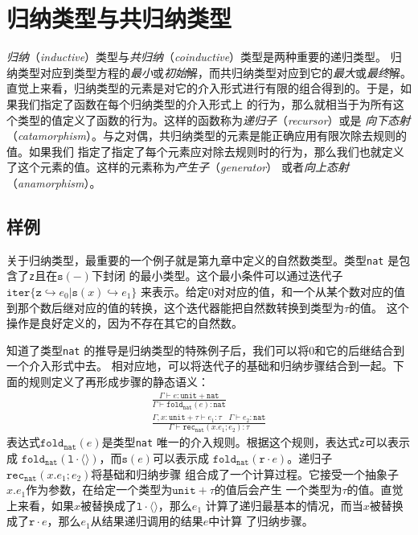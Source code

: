 \chapter{归纳类型与共归纳类型}

\textit{归纳}（\textit{inductive}）类型与\textit{共归纳}（\textit{coinductive}）类型是两种重要的递归类型。
归纳类型对应到类型方程的\textit{最小}或\textit{初始}解，而共归纳类型对应到它的\textit{最大}或\textit{最终}解。
直觉上来看，归纳类型的元素是对它的介入形式进行有限的组合得到的。于是，如果我们指定了函数在每个归纳类型的介入形式上
的行为，那么就相当于为所有这个类型的值定义了函数的行为。这样的函数称为\textit{递归子}（\textit{recursor}）或是
\textit{向下态射}（\textit{catamorphism}）。与之对偶，共归纳类型的元素是能正确应用有限次除去规则的值。如果我们
指定了指定了每个元素应对除去规则时的行为，那么我们也就定义了这个元素的值。这样的元素称为\textit{产生子}（\textit{generator}）
或者\textit{向上态射}（\textit{anamorphism}）。

\section{样例}\label{section-15.1}

关于归纳类型，最重要的一个例子就是第九章中定义的自然数类型。类型\texttt{nat} 是包含了\texttt{z}且在$\texttt{s}(-)$下封闭
的最小类型。这个最小条件可以通过迭代子$\texttt{iter} \{\texttt{z}\hookrightarrow e_0|\texttt{s}(x)\hookrightarrow e_1\}$
来表示。给定0对对应的值，和一个从某个数对应的值到那个数后继对应的值的转换，这个迭代器能把自然数转换到类型为$\tau$的值。
这个操作是良好定义的，因为不存在其它的自然数。

知道了类型\texttt{nat} 的推导是归纳类型的特殊例子后，我们可以将0和它的后继结合到一个介入形式中去。
相对应地，可以将迭代子的基础和归纳步骤结合到一起。下面的规则定义了再形成步骤的静态语义：
\begin{subequations}
	\begin{gather}
	\frac{\Gamma\vdash e:\texttt{unit} +\texttt{nat}}{\Gamma\vdash\texttt{fold}_\texttt{nat}(e):\texttt{nat}} \\
	\frac{\Gamma,x:\texttt{unit} + \tau\vdash e_1:\tau\ \ \ \ \Gamma\vdash e_2:\texttt{nat}}{\Gamma\vdash\texttt{rec}_\texttt{nat}(x.e_1;e_2):\tau}
	\end{gather}
\end{subequations}
表达式$\texttt{fold}_\texttt{nat}(e)$是类型\texttt{nat} 唯一的介入规则。根据这个规则，表达式\texttt{z}可以表示成
$\texttt{fold}_\texttt{nat}(\texttt{l}\cdot\langle\rangle)$，而$\texttt{s}(e)$可以表示成
$\texttt{fold}_\texttt{nat}(\texttt{r}\cdot e)$。递归子$\texttt{rec}_\texttt{nat}(x.e_1;e_2)$将基础和归纳步骤
组合成了一个计算过程。它接受一个抽象子$x.e_1$作为参数，在给定一个类型为$\texttt{unit} +\tau$的值后会产生
一个类型为$\tau$的值。直觉上来看，如果$x$被替换成了$\texttt{l}\cdot\langle\rangle$，那么$e_1$
计算了递归最基本的情况，而当$x$被替换成了$\texttt{r}\cdot e$，那么$e_1$从结果递归调用的结果$e$中计算
了归纳步骤。

